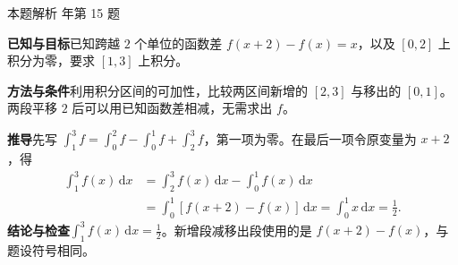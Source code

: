 \documentclass[UTF8,zihao=-4,fontset=fandol]{ctexart}
\newenvironment{QuestionSolution}[1]{%
  \clearpage
  {\small\textcolor{black!60}{本题解析\quad #1}}\par\medskip
}{\par\clearpage}
\begin{document}
\begin{QuestionSolution}{2023 年第 15 题}
\textbf{已知与目标}\quad 已知跨越 \(2\) 个单位的函数差 \(f(x+2)-f(x)=x\)，以及 \([0,2]\) 上积分为零，要求 \([1,3]\) 上积分。

\textbf{方法与条件}\quad 利用积分区间的可加性，比较两区间新增的 \([2,3]\) 与移出的 \([0,1]\)。两段平移 \(2\) 后可以用已知函数差相减，无需求出 \(f\)。

\textbf{推导}\quad 先写 \(\int_1^3f=\int_0^2f-\int_0^1f+\int_2^3f\)，第一项为零。在最后一项令原变量为 \(x+2\)，得
\[
\begin{aligned}
\int_1^3f(x)\,\mathrm{d}x
&=\int_2^3f(x)\,\mathrm{d}x-\int_0^1f(x)\,\mathrm{d}x\\
&=\int_0^1[f(x+2)-f(x)]\,\mathrm{d}x
=\int_0^1 x\,\mathrm{d}x=\boxed{\frac12}.
\end{aligned}
\]
\textbf{结论与检查}\quad \(\boxed{\int_1^3f(x)\,\mathrm{d}x=\frac{1}{2}}\)。新增段减移出段使用的是 \(f(x+2)-f(x)\)，与题设符号相同。
\end{QuestionSolution}
\end{document}
